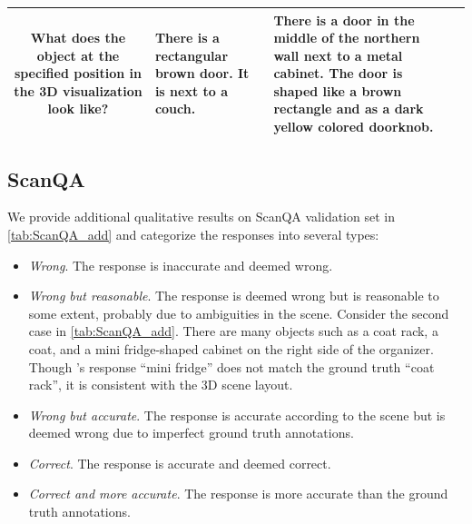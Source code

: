 \begin{table}[t]
\begin{tabular}{c|p{8em}|p{8em}|p{10em}}
            What does the object at the specified position in the 3D visualization look like? & There is a rectangular brown door. It is next to a couch. & There is a door in the middle of the northern wall next to a metal cabinet. The door is shaped like a brown rectangle and as a dark yellow colored doorknob. \\
        \bottomrule
\end{tabular}

\label{tab:Scan2Cap_add}
\end{table}

\subsection{ScanQA}

We provide additional qualitative results on ScanQA validation set in \cref{tab:ScanQA_add} and categorize the responses into several types:
\begin{itemize}[leftmargin=*]
    \item \textit{Wrong}. The response is inaccurate and deemed wrong.
    \item \textit{Wrong but reasonable}. The response is deemed wrong but is reasonable to some extent, probably due to ambiguities in the scene. Consider the second case in \cref{tab:ScanQA_add}. There are many objects such as a coat rack, a coat, and a mini fridge-shaped cabinet on the right side of the organizer. Though \agent's response ``mini fridge'' does not match the ground truth ``coat rack'', it is consistent with the 3D scene layout.
    \item \textit{Wrong but accurate}. The response is accurate according to the scene but is deemed wrong due to imperfect ground truth annotations.
    \item \textit{Correct}. The response is accurate and deemed correct.
    \item \textit{Correct and more accurate}. The response is more accurate than the ground truth annotations.
\end{itemize}
 


